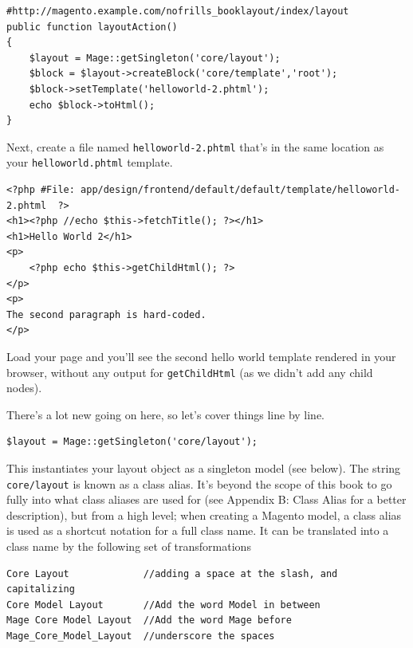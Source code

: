 \documentclass[oneside]{book}
\begin{document}
\begin{lstlisting}
#http://magento.example.com/nofrills_booklayout/index/layout
public function layoutAction()
{
    $layout = Mage::getSingleton('core/layout');
    $block = $layout->createBlock('core/template','root');
    $block->setTemplate('helloworld-2.phtml');
    echo $block->toHtml();
}

\end{lstlisting}


Next, create a file named \footnotesize\texttt{helloworld-2.phtml} \normalsize  that's in the same location as your \footnotesize\texttt{helloworld.phtml} \normalsize  template.

\begin{lstlisting}
<?php #File: app/design/frontend/default/default/template/helloworld-2.phtml  ?>
<h1><?php //echo $this->fetchTitle(); ?></h1>
<h1>Hello World 2</h1>
<p>
    <?php echo $this->getChildHtml(); ?>
</p>
<p>
The second paragraph is hard-coded.
</p>

\end{lstlisting}


Load your page and you'll see the second hello world template rendered in your browser, without any output for \footnotesize\texttt{getChildHtml} \normalsize  (as we didn't add any child nodes).

There's a lot new going on here, so let's cover things line by line.

\begin{lstlisting}
$layout = Mage::getSingleton('core/layout');

\end{lstlisting}


This instantiates your layout object as a singleton model (see below). The string \footnotesize\texttt{core/layout} \normalsize  is known as a class alias.  It's beyond the scope of this book to go fully into what class aliases are used for (see Appendix B: Class Alias for a better description), but from a high level; when creating a Magento model, a class alias is used as a shortcut notation for a full class name.  It can be translated into a class name by the following set of transformations

\begin{lstlisting}
Core Layout             //adding a space at the slash, and capitalizing
Core Model Layout       //Add the word Model in between
Mage Core Model Layout  //Add the word Mage before
Mage_Core_Model_Layout  //underscore the spaces

\end{lstlisting}
\end{document}
